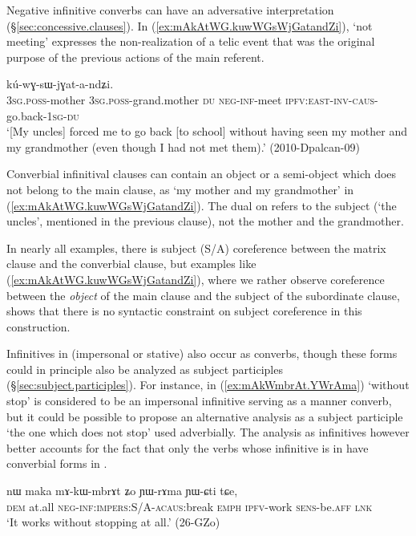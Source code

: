 Negative infinitive converbs can have an adversative interpretation (§\ref{sec:concessive.clauses}). In (\ref{ex:mAkAtWG.kuwWGsWjGatandZi}),   `not meeting' expresses the non-realization of a telic event that was the original purpose of the previous actions of the main referent. 

\begin{exe}
\ex \label{ex:mAkAtWG.kuwWGsWjGatandZi}
\gll [a-mu a-wi ni mɤ-kɤ-ɤtɯɣ] kú-wɣ-sɯ-jɣat-a-ndʑi. \\
\textsc{3sg}.\textsc{poss}-mother \textsc{3sg}.\textsc{poss}-grand.mother \textsc{du} \textsc{neg}-\textsc{inf}-meet \textsc{ipfv}:\textsc{east}-\textsc{inv}-\textsc{caus}-go.back-\textsc{1sg}-\textsc{du} \\
\glt `[My uncles] forced me to go back [to school] without having seen my mother and my grandmother (even though I had not met them).' (2010-Dpalcan-09)
\end{exe}

Converbial infinitival clauses can contain an object or a semi-object which does not belong to the main clause, as  `my mother and my grandmother' in (\ref{ex:mAkAtWG.kuwWGsWjGatandZi}). The dual on  refers to the subject (`the uncles', mentioned in the previous clause), not the mother and the grandmother.

In nearly all examples, there is subject (S/A) coreference between the matrix clause and the converbial clause, but examples like (\ref{ex:mAkAtWG.kuwWGsWjGatandZi}), where we rather observe coreference between the \textit{object} of the main clause and the subject of the subordinate clause, shows that there is no syntactic constraint on subject coreference in this construction.

Infinitives in  (impersonal or stative) also occur as converbs, though these forms could in principle also be analyzed as subject participles (§\ref{sec:subject.participles}). For instance, in (\ref{ex:mAkWmbrAt.YWrAma})  `without stop' is considered to be an impersonal infinitive serving as a manner converb, but it could be possible to propose an alternative analysis as a  subject participle `the one which does not stop' used adverbially.  The analysis as infinitives however better accounts for the fact that only the verbs whose infinitive is in  have converbial forms in .

\begin{exe}
\ex \label{ex:mAkWmbrAt.YWrAma}
 \gll nɯ maka mɤ-kɯ-mbrɤt ʑo ɲɯ-rɤma ɲɯ-ɕti tɕe,  \\
 \textsc{dem} at.all  \textsc{neg}-\textsc{inf}:\textsc{impers}:S/A-\textsc{acaus}:break \textsc{emph} \textsc{ipfv}-work \textsc{sens}-be.\textsc{aff} \textsc{lnk} \\
 \glt `It works without stopping at all.' (26-GZo)
\end{exe}

